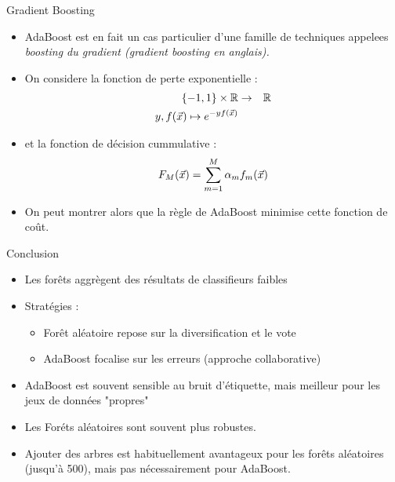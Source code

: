\begin{frame}{Gradient Boosting}
\begin{itemize}
  \item AdaBoost est en fait un cas particulier d'une famille de techniques appelees \textit{boosting du gradient (gradient boosting en anglais).}
  \item On considere la fonction de perte exponentielle : 
\begin{eqnarray*}
\{-1, 1\} \times {\mathbb R} &\rightarrow& {\mathbb R} \\
y,f(\vec{x}) \mapsto e^{-yf(\vec{x})}
\end{eqnarray*}
\item et la fonction de décision cummulative : 
\begin{equation*}
      F_M(\vec{x}) = \sum_{m=1}^{M}\alpha_mf_m(\vec{x})
\end{equation*}
\item On peut montrer alors que la règle de AdaBoost minimise cette fonction de coût. 
\end{itemize}
\end{frame}

\begin{frame}{Conclusion}
\begin{itemize}
  \item Les forêts aggrègent des résultats de classifieurs faibles
  \item Stratégies : 
  \begin{itemize}
    \item Forêt aléatoire repose sur la diversification et le vote
    \item AdaBoost focalise sur les erreurs (approche collaborative)
  \end{itemize}
  \item AdaBoost est souvent sensible au bruit d'étiquette, mais meilleur pour les jeux de données "propres" 
  \item Les Foréts aléatoires sont souvent plus robustes. 
  \item Ajouter des arbres est habituellement avantageux pour les forêts aléatoires (jusqu'à 500), mais pas nécessairement pour AdaBoost. 
\end{itemize}

\end{frame}

